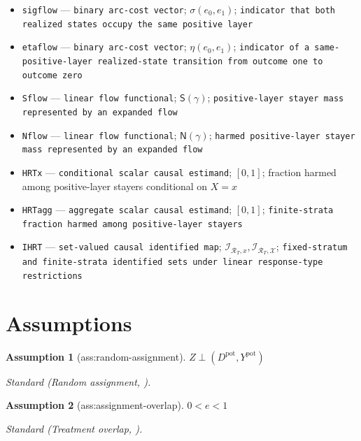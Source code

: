 \documentclass{article}
\newtheorem{assumption}{Assumption}
\begin{document}
\begin{itemize}
  \item \texttt{sigflow} --- \texttt{binary arc-\allowbreak{}cost vector}; \(\sigma(e_0,e_1)\); \texttt{indicator that both realized states occupy the same positive layer}
  \item \texttt{etaflow} --- \texttt{binary arc-\allowbreak{}cost vector}; \(\eta(e_0,e_1)\); \texttt{indicator of a same-\allowbreak{}positive-\allowbreak{}layer realized-\allowbreak{}state transition from outcome one to outcome zero}
  \item \texttt{Sflow} --- \texttt{linear flow functional}; \(\mathsf S(\gamma)\); \texttt{positive-\allowbreak{}layer stayer mass represented by an expanded flow}
  \item \texttt{Nflow} --- \texttt{linear flow functional}; \(\mathsf N(\gamma)\); \texttt{harmed positive-\allowbreak{}layer stayer mass represented by an expanded flow}
  \item \texttt{HRTx} --- \texttt{conditional scalar causal estimand}; \([0,1]\); fraction harmed among positive-layer stayers conditional on \(X=x\)
  \item \texttt{HRTagg} --- \texttt{aggregate scalar causal estimand}; \([0,1]\); \texttt{finite-\allowbreak{}strata fraction harmed among positive-\allowbreak{}layer stayers}
  \item \texttt{IHRT} --- \texttt{set-\allowbreak{}valued causal identified map}; \(\mathcal I_{\mathcal R_T,x},\mathcal I_{\mathcal R_T,\mathcal X}\); \texttt{fixed-\allowbreak{}stratum and finite-\allowbreak{}strata identified sets under linear response-\allowbreak{}type restrictions}
\end{itemize}

\section{Assumptions}

\begin{assumption}[ass:random-assignment]\label{ass:random-assignment}
\(Z\perp(D^{\mathrm{pot}},Y^{\mathrm{pot}})\)
\par\smallskip\noindent\emph{Standard} (Random assignment, \cite{PossebomRiva2025}).
\end{assumption}

\begin{assumption}[ass:assignment-overlap]\label{ass:assignment-overlap}
\(0<e<1\)
\par\smallskip\noindent\emph{Standard} (Treatment overlap, \cite{PossebomRiva2025}).
\end{assumption}
\end{document}
